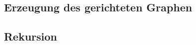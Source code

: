 \documentclass[10pt,a4paper]{scrartcl}
\begin{document}
\subsection{Erzeugung des gerichteten Graphen}

\subsection{Rekursion}



\listoffigures
\end{document}
